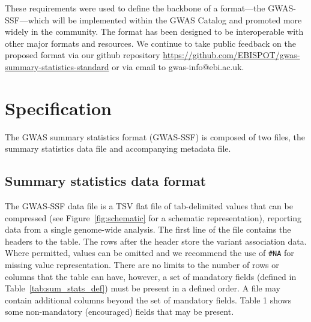 \documentclass[11pt]{article}
\begin{document}
These requirements were used to define the backbone of a format---the GWAS-SSF---which will be implemented within the GWAS Catalog and promoted more widely in the community. The format has been designed to be interoperable with other major formats and resources. We continue to take public feedback on the proposed format via our github repository \url{https://github.com/EBISPOT/gwas-summary-statistics-standard} or via email to gwas-info@ebi.ac.uk.

\section{Specification}
The GWAS summary statistics format (GWAS-SSF) is composed of two files, the summary statistics data file and accompanying metadata file.

\subsection{Summary statistics data format}
The GWAS-SSF data file is a TSV flat file of tab-delimited values that can be compressed (see Figure~\ref{fig:schematic} for a schematic representation), reporting data from a single genome-wide analysis. The first line of the file contains the headers to the table. The rows after the header store the variant association data. Where permitted, values can be omitted and we recommend the use of \texttt{\#NA} for missing value representation. There are no limits to the number of rows or columns that the table can have, however, a set of mandatory fields (defined in Table~\ref{tab:sum_stats_def}) must be present in a defined order. A file may contain additional columns beyond the set of mandatory fields. Table 1 shows some non-mandatory (encouraged) fields that may be present.
\end{document}
